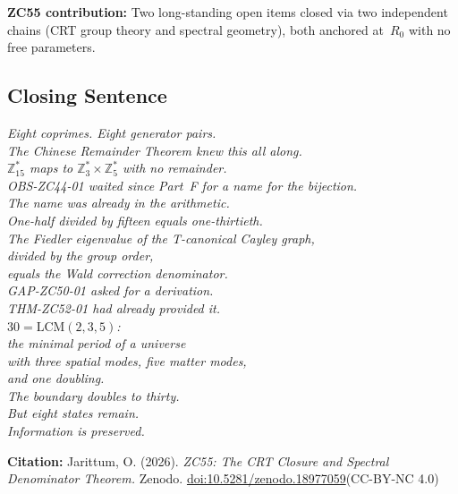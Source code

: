 \documentclass[12pt, a4paper]{article}
\begin{document}
\begin{genealogybox}
\medskip
\textbf{ZC55 contribution:}
Two long-standing open items closed via two independent chains (CRT
group theory and spectral geometry), both anchored at~$R_0$
with no free parameters.
\end{genealogybox}

\subsection{Closing Sentence}

\begin{center}
\textit{%
  Eight coprimes. Eight generator pairs.\\[0.5em]
  The Chinese Remainder Theorem knew this all along.\\
  $\mathbb{Z}_{15}^*$ maps to $\mathbb{Z}_3^*\times\mathbb{Z}_5^*$
  with no remainder.\\
  OBS-ZC44-01 waited since Part~F for a name for the bijection.\\
  The name was already in the arithmetic.\\[0.5em]
  One-half divided by fifteen equals one-thirtieth.\\
  The Fiedler eigenvalue of the T-canonical Cayley graph,\\
  divided by the group order,\\
  equals the Wald correction denominator.\\
  GAP-ZC50-01 asked for a derivation.\\
  THM-ZC52-01 had already provided it.\\[0.5em]
  $30=\mathrm{LCM}(2,3,5)$:\\
  the minimal period of a universe\\
  with three spatial modes, five matter modes,\\
  and one doubling.\\[0.3em]
  The boundary doubles to thirty.\\
  But eight states remain.\\
  Information is preserved.}
\end{center}

\bigskip
\begin{center}
\textbf{Citation:} Jarittum, O. (2026).
\textit{ZC55: The CRT Closure and Spectral Denominator Theorem.}
Zenodo.
\href{https://doi.org/10.5281/zenodo.18977059}%
{doi:10.5281/zenodo.18977059}\quad (CC-BY-NC 4.0)
\end{center}
\end{document}
